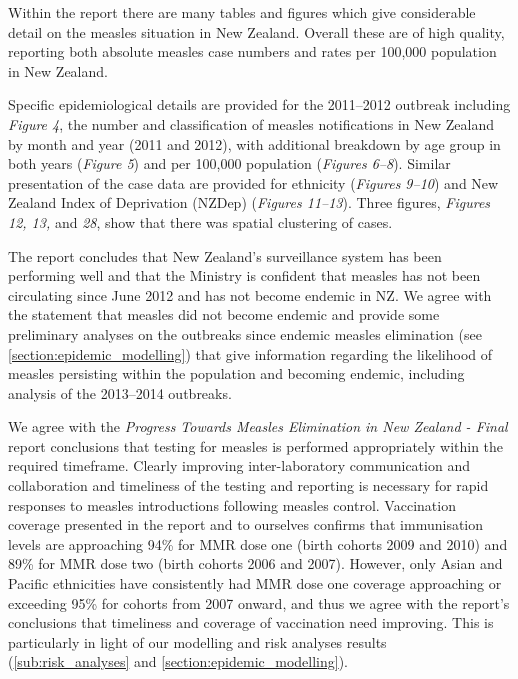 \documentclass{article}
\begin{document}
Within the report there are many tables and figures which give considerable detail on the measles situation in New Zealand. Overall these are of high quality, reporting both absolute measles case numbers and rates per 100,000 population in New Zealand.

Specific epidemiological details are provided for the 2011--2012 outbreak including \emph{Figure 4}, the number and classification of measles notifications in New Zealand by month and year (2011 and 2012), with additional breakdown by age group in both years (\emph{Figure 5}) and per 100,000 population (\emph{Figures 6--8}). Similar presentation of the case data are provided for ethnicity (\emph{Figures 9--10}) and New Zealand Index of Deprivation (NZDep) (\emph{Figures 11--13}). Three figures, \emph{Figures 12, 13,} and \emph{28}, show that there was spatial clustering of cases.

The report concludes that New Zealand's surveillance system has been performing well and that the Ministry is confident that measles has not been circulating since June 2012 and has not become endemic in NZ. We agree with the statement that measles did not become endemic and provide some preliminary analyses on the outbreaks since endemic measles elimination (see \autoref{section:epidemic_modelling}) that give information regarding the likelihood of measles persisting within the population and becoming endemic, including analysis of the 2013--2014 outbreaks.

We agree with the \emph {Progress Towards Measles Elimination in New Zealand - Final} report conclusions that testing for measles is performed appropriately within the required timeframe. Clearly improving inter-laboratory communication and collaboration and timeliness of the testing and reporting is necessary for rapid responses to measles introductions following measles control. Vaccination coverage presented in the report and to ourselves confirms that immunisation levels are approaching 94\% for MMR dose one (birth cohorts 2009 and 2010) and 89\% for MMR dose two (birth cohorts 2006 and 2007). However, only Asian and Pacific ethnicities have consistently had MMR dose one coverage approaching or exceeding 95\% for cohorts from 2007 onward, and thus we agree with the report's conclusions that timeliness and coverage of vaccination need improving. This is particularly in light of our modelling and risk analyses results (\autoref{sub:risk_analyses} and \autoref{section:epidemic_modelling}).
\end{document}
